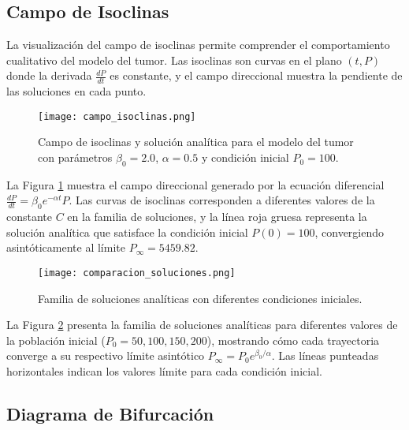 \documentclass[a4paper,10pt,twocolumn]{article}
\begin{document}

\subsection{Campo de Isoclinas}\label{subsec:isoclinas}

La visualización del campo de isoclinas permite comprender el comportamiento cualitativo del modelo del tumor. Las isoclinas son curvas en el plano $(t, P)$ donde la derivada $\frac{dP}{dt}$ es constante, y el campo direccional muestra la pendiente de las soluciones en cada punto.

\begin{figure}[H]
    \centering
    \texttt{[image: campo\_isoclinas.png]}
    \caption{Campo de isoclinas y solución analítica para el modelo del tumor con parámetros $\beta_0=2.0$, $\alpha=0.5$ y condición inicial $P_0=100$.}
    \label{fig:isoclinas}
\end{figure}

La Figura \ref{fig:isoclinas} muestra el campo direccional generado por la ecuación diferencial $\frac{dP}{dt} = \beta_0 e^{-\alpha t} P$. Las curvas de isoclinas corresponden a diferentes valores de la constante $C$ en la familia de soluciones, y la línea roja gruesa representa la solución analítica que satisface la condición inicial $P(0)=100$, convergiendo asintóticamente al límite $P_{\infty} = 5459.82$.

\begin{figure}[H]
    \centering
    \texttt{[image: comparacion\_soluciones.png]}
    \caption{Familia de soluciones analíticas con diferentes condiciones iniciales.}
    \label{fig:comparacion}
\end{figure}

La Figura \ref{fig:comparacion} presenta la familia de soluciones analíticas para diferentes valores de la población inicial ($P_0 = 50, 100, 150, 200$), mostrando cómo cada trayectoria converge a su respectivo límite asintótico $P_{\infty} = P_0 e^{\beta_0/\alpha}$. Las líneas punteadas horizontales indican los valores límite para cada condición inicial.


\subsection{Diagrama de Bifurcación}\label{subsec:bifurcacion}
\end{document}
